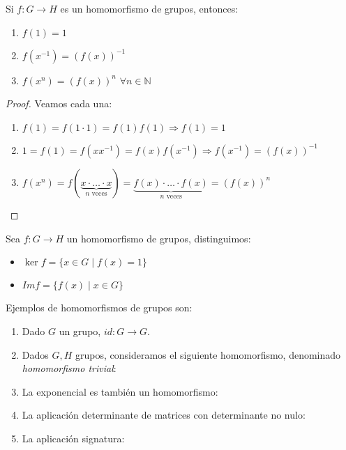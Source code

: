 \begin{prop}
    Si $f:G\to H$ es un homomorfismo de grupos, entonces:
    \begin{enumerate}
        \item $f(1) = 1$
        \item $f(x^{-1}) = {(f(x))}^{-1}$
        \item $f(x^n) = {(f(x))}^{n}$ $\forall n\in \mathbb{N}$
    \end{enumerate}
    \begin{proof}
        Veamos cada una:
        \begin{enumerate}
            \item $f(1) = f(1\cdot 1) = f(1)f(1)\Longrightarrow f(1) = 1$
            \item $1 = f(1) = f(xx^{-1}) = f(x)f(x^{-1}) \Longrightarrow f(x^{-1}) = {(f(x))}^{-1}$
            \item $f(x^n) = f(\underbrace{x\cdot \ldots \cdot x}_{n \text{\ veces}}) = \underbrace{f(x)\cdot \ldots\cdot f(x)}_{n \text{\ veces}} = {(f(x))}^{n}$
        \end{enumerate}
    \end{proof}
\end{prop}

\begin{definicion}
Sea $f:G\to H$ un homomorfismo de grupos, distinguimos:
\begin{itemize}
    \item $\ker f = \{x\in G \mid f(x) = 1\}$
    \item $Im f = \{f(x) \mid x\in G\}$
\end{itemize}
\end{definicion}

\begin{ejemplo}
    Ejemplos de homomorfismos de grupos son:
    \begin{enumerate}
        \item Dado $G$ un grupo, $id:G\to G$.
        \item Dados $G,H$ grupos, consideramos el siguiente homomorfismo, denominado \emph{homomorfismo trivial}:
        \item La exponencial es también un homomorfismo:
        
        \item La aplicación determinante de matrices con determinante no nulo:
        \item La aplicación signatura:
    \end{enumerate}
\end{ejemplo}

